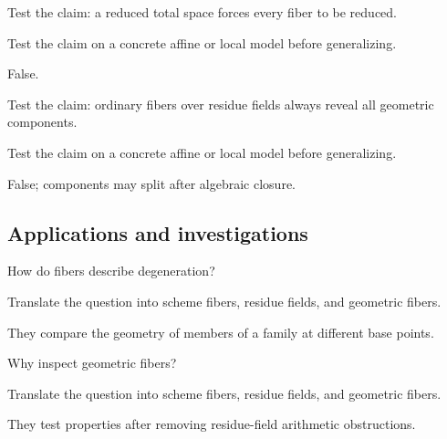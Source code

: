\begin{exercise}\label{exr:vi25-expand-11}
Test the claim: a reduced total space forces every fiber to be reduced.
\end{exercise}
\begin{hint}
Test the claim on a concrete affine or local model before generalizing.
\end{hint}
\begin{solution}
False.
\end{solution}

\begin{exercise}\label{exr:vi25-expand-12}
Test the claim: ordinary fibers over residue fields always reveal all geometric components.
\end{exercise}
\begin{hint}
Test the claim on a concrete affine or local model before generalizing.
\end{hint}
\begin{solution}
False; components may split after algebraic closure.
\end{solution}

\subsection*{Applications and investigations}

\begin{exercise}[Degeneration]\label{exr:vi25-expand-13}
How do fibers describe degeneration?
\end{exercise}
\begin{hint}
Translate the question into scheme fibers, residue fields, and geometric fibers.
\end{hint}
\begin{solution}
They compare the geometry of members of a family at different base points.
\end{solution}

\begin{exercise}\label{exr:vi25-expand-14}
Why inspect geometric fibers?
\end{exercise}
\begin{hint}
Translate the question into scheme fibers, residue fields, and geometric fibers.
\end{hint}
\begin{solution}
They test properties after removing residue-field arithmetic obstructions.
\end{solution}

